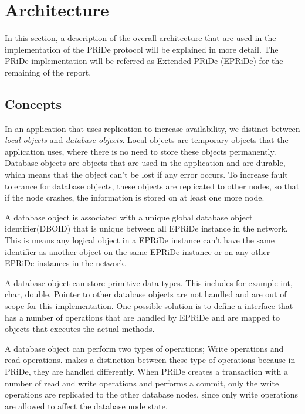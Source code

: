 
\section{Architecture} %
\label{sec:arch}

In this section, a description of the overall architecture that are used in the implementation of the PRiDe protocol will be explained in more detail. The PRiDe implementation will be referred as Extended PRiDe (EPRiDe) for the remaining of the report.  


\subsection{Concepts} %
\label{sub:consepts}

In an application that uses replication to increase availability, we distinct between \emph{local objects} and \emph{database objects}. Local objects are temporary objects that the application uses, where there is no need to store these objects permanently. Database objects are objects that are used in the application and are durable, which means that the object can't be lost if any error occurs. To increase fault tolerance for database objects, these objects are replicated to other nodes, so that if the node crashes, the information is stored on at least one more node. 

A database object is associated with a unique global database object identifier(DBOID) that is unique between all EPRiDe instance in the network. This is means any logical object in a EPRiDe instance can't have the same identifier as another object on the same EPRiDe instance or on any other EPRiDe instances in the network.    

A database object can store primitive data types. This includes for example int, char, double. Pointer to other database objects are not handled and are out of scope for this implementation. One possible solution is to define a interface that has a number of operations that are handled by EPRiDe and are mapped to objects that executes the actual methods.  

A database object can perform two types of operations; Write operations and read operations. \cite{Syber2007} makes a distinction between these type of operations because in PRiDe, they are handled differently. When PRiDe creates a transaction with a number of read and write operations and performs a commit, only the write operations are replicated to the other database nodes, since only write operations are allowed to affect the database node state.      

